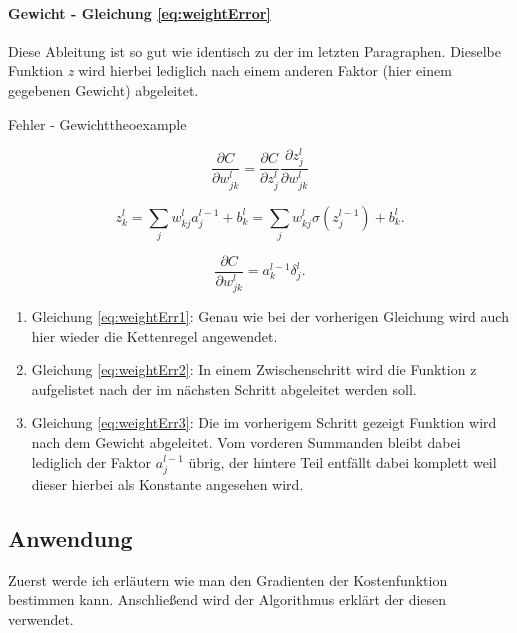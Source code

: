 \paragraph{Gewicht - Gleichung \ref{eq:weightError}}
Diese Ableitung ist so gut wie identisch zu der im letzten Paragraphen. Dieselbe Funktion \emph{z} wird hierbei lediglich nach einem anderen Faktor (hier einem gegebenen Gewicht) abgeleitet.

\begin{myderivation}{Fehler - Gewicht}{theoexample}


\begin{equation} \label{eq:weightErr1}
\frac{\partial C}{\partial w^l_{jk}} = \frac{\partial C}{\partial z^l_j} \frac{\partial z^l_j}{\partial w^l_{jk}}
\end{equation}

\begin{equation} \label{eq:weightErr2}
z^{l}_k = \sum_j w^{l}_{kj} a^{l-1}_j +b^l_k = \sum_j w^l_{kj} \sigma(z^{l-1}_j) +b^l_k.
\end{equation}

\begin{equation} \label{eq:weightErr3}
\frac{\partial C}{\partial w^l_{jk}} = a^{l-1}_k \delta^l_j.
\end{equation}

\end{myderivation}


\begin{enumerate}

\item Gleichung \ref{eq:weightErr1}: Genau wie bei der vorherigen Gleichung wird auch hier wieder die Kettenregel angewendet.

\item Gleichung \ref{eq:weightErr2}: In einem Zwischenschritt wird die Funktion z aufgelistet nach der im nächsten Schritt abgeleitet werden soll.

\item Gleichung \ref{eq:weightErr3}: Die im vorherigem Schritt gezeigt Funktion wird nach dem Gewicht abgeleitet. Vom vorderen Summanden bleibt dabei lediglich der Faktor $a^{l-1}_j$ übrig, der hintere Teil entfällt dabei komplett weil dieser hierbei als Konstante angesehen wird.

\end{enumerate}




\subsection{Anwendung}
Zuerst werde ich erläutern wie man den Gradienten der Kostenfunktion bestimmen kann. Anschließend wird der Algorithmus erklärt der diesen verwendet.


